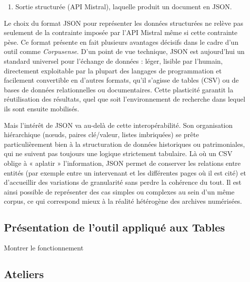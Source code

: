 \begin{enumerate}
\item Sortie structurée (API Mistral), laquelle produit un document en JSON. 

\end{enumerate}
Le choix du format JSON pour représenter les données structurées ne relève pas seulement de la contrainte imposée par l’API Mistral même si cette contrainte pèse. Ce format présente en fait plusieurs avantages décisifs dans le cadre d’un outil comme \emph{Corpusense}. D’un point de vue technique, JSON est aujourd’hui un standard universel pour l’échange de données : léger, lisible par l’humain, directement exploitable par la plupart des langages de programmation et facilement convertible en d’autres formats, qu’il s’agisse de tables (CSV) ou de bases de données relationnelles ou documentaires. Cette plasticité garantit la réutilisation des résultats, quel que soit l’environnement de recherche dans lequel ils sont ensuite mobilisés.

Mais l’intérêt de JSON va au-delà de cette interopérabilité. Son organisation hiérarchique (nœuds, paires clé/valeur, listes imbriquées) se prête particulièrement bien à la structuration de données historiques ou patrimoniales, qui ne suivent pas toujours une logique strictement tabulaire. Là où un CSV oblige à « aplatir » l’information, JSON permet de conserver les relations entre entités (par exemple entre un intervenant et les différentes pages où il est cité) et d’accueillir des variations de granularité sans perdre la cohérence du tout. Il est ainsi possible de représenter des cas simples ou complexes au sein d’un même corpus, ce qui correspond mieux à la réalité hétérogène des archives numérisées.



\subsection{Présentation de l'outil appliqué aux Tables}

Montrer le fonctionnement

\subsection{Ateliers}

